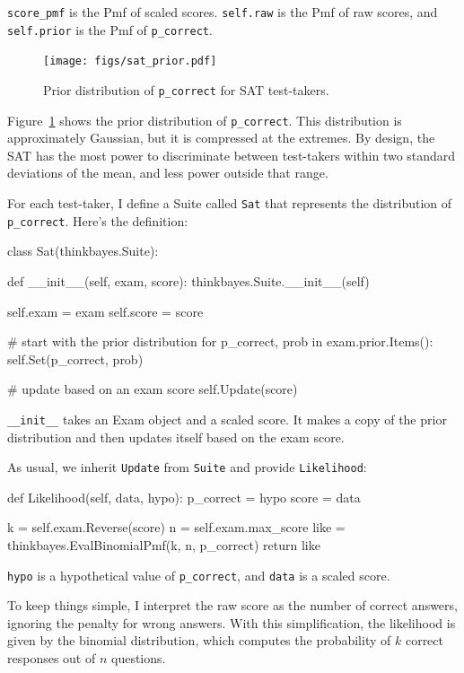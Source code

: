 \documentclass[12pt]{book}
\theoremstyle{exercise}
\newcommand{\py}[1]{{\tt #1}}%
\begin{document}
\verb"score_pmf" is the Pmf of
scaled scores.   \py{self.raw} is the Pmf of raw scores, and
\py{self.prior} is the Pmf of \verb"p_correct".

\begin{figure}
\centerline{\texttt{[image: figs/sat\_prior.pdf]}}
\caption{Prior distribution of \py{p_correct} for SAT test-takers.}
\label{fig.satprior}
\end{figure}

Figure~\ref{fig.satprior} shows the prior distribution of
\verb"p_correct".  This distribution is approximately Gaussian, but it
is compressed at the extremes.  By design, the SAT has the most power
to discriminate between test-takers within two standard deviations of
the mean, and less power outside that range.

For each test-taker, I define a Suite called \py{Sat} that
represents the distribution of \verb"p_correct".  Here's the definition:

\begin{code}
class Sat(thinkbayes.Suite):

    def __init__(self, exam, score):
        thinkbayes.Suite.__init__(self)

        self.exam = exam
        self.score = score

        # start with the prior distribution
        for p_correct, prob in exam.prior.Items():
            self.Set(p_correct, prob)

        # update based on an exam score
        self.Update(score)
\end{code}

\verb"__init__" takes an Exam object and a scaled score.  It makes a
copy of the prior distribution and then updates itself based on the
exam score.

As usual, we inherit \py{Update} from \py{Suite} and provide
\py{Likelihood}:

\begin{code}
    def Likelihood(self, data, hypo):
        p_correct = hypo
        score = data

        k = self.exam.Reverse(score)
        n = self.exam.max_score
        like = thinkbayes.EvalBinomialPmf(k, n, p_correct)
        return like
\end{code}

\py{hypo} is a hypothetical
value of \verb"p_correct", and \py{data} is a scaled score.

To keep things simple, I interpret the raw score as the number of
correct answers, ignoring the penalty for wrong answers.  With
this simplification, the likelihood is given by the binomial
distribution, which computes the probability of $k$ correct
responses out of $n$ questions.
\end{document}
